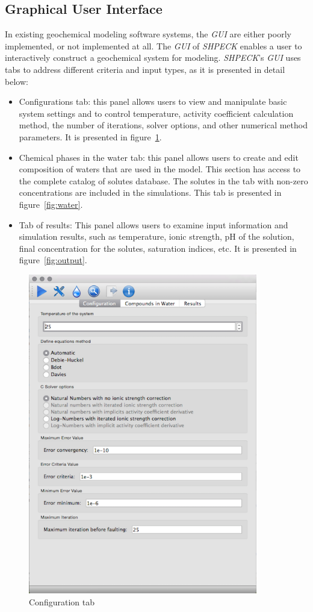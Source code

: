 \documentclass[preprint,12pt,3p]{elsarticle}
\begin{document}
\subsection{Graphical User Interface}
In existing geochemical modeling software systems, the \emph{GUI} are either poorly implemented, or not implemented at all. The \emph{GUI} of \emph{SHPECK} enables a user to interactively construct a geochemical system for modeling. \emph{SHPECK}'s \emph{GUI} uses tabs to address different criteria and input types, as it is presented in detail below:
\begin{itemize}
\item Configurations tab: this panel allows users to view and manipulate basic system settings and to control temperature, activity coefficient calculation method, the number of iterations, solver options, and other numerical method parameters. It is presented in figure~\ref{fig:config}.
\item Chemical phases in the water tab: this panel allows users to create and edit composition of waters that are used in the model. This section has access to the complete catalog of solutes database. The solutes in the tab with non-zero concentrations are included in the simulations. This tab is presented in figure~\ref{fig:water}.
\item Tab of results: This panel allows users to examine input information and simulation results, such as temperature, ionic strength, pH of the solution, final concentration for the solutes, saturation indices, etc. It is presented in figure~\ref{fig:output}.
\end{itemize}

\begin{figure}[ht!]
\centering
\includegraphics[width=100mm]{shpeck-configtab.png}
\caption{Configuration tab}
\label{fig:config}
\end{figure}
\end{document}
